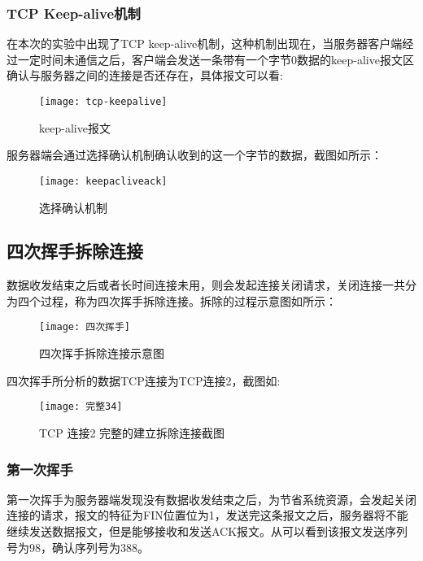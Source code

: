 \documentclass[lang=cn,11pt]{elegantpaper}
\begin{document}
\subsubsection{TCP Keep-alive机制}

在本次的实验中出现了TCP keep-alive机制，这种机制出现在，当服务器客户端经过一定时间未通信之后，客户端会发送一条带有一个字节0数据的keep-alive报文区确认与服务器之间的连接是否还存在，具体报文可以看:

\begin{figure}[htbp]
	\centering
	\texttt{[image: tcp-keepalive]}
	\caption{keep-alive报文 \label{fig:13}}
\end{figure}

服务器端会通过选择确认机制确认收到的这一个字节的数据，截图如所示：

\begin{figure}[htbp]
	\centering
	\texttt{[image: keepacliveack]}
	\caption{选择确认机制 \label{fig:15}}
\end{figure}

\newpage
\subsection{四次挥手拆除连接}
数据收发结束之后或者长时间连接未用，则会发起连接关闭请求，关闭连接一共分为四个过程，称为四次挥手拆除连接。拆除的过程示意图如所示：

\begin{figure}[htbp]
	\centering
	\texttt{[image: 四次挥手]}
	\caption{四次挥手拆除连接示意图 \label{fig:16}}
\end{figure}

四次挥手所分析的数据TCP连接为TCP连接2，截图如:

\begin{figure}[htbp]
	\centering
	\texttt{[image: 完整34]}
	\caption{TCP 连接2 完整的建立拆除连接截图 \label{fig:17}}
\end{figure}


\subsubsection{第一次挥手}

第一次挥手为服务器端发现没有数据收发结束之后，为节省系统资源，会发起关闭连接的请求，报文的特征为FIN位置位为1，发送完这条报文之后，服务器将不能继续发送数据报文，但是能够接收和发送ACK报文。从可以看到该报文发送序列号为98，确认序列号为388。
\end{document}
